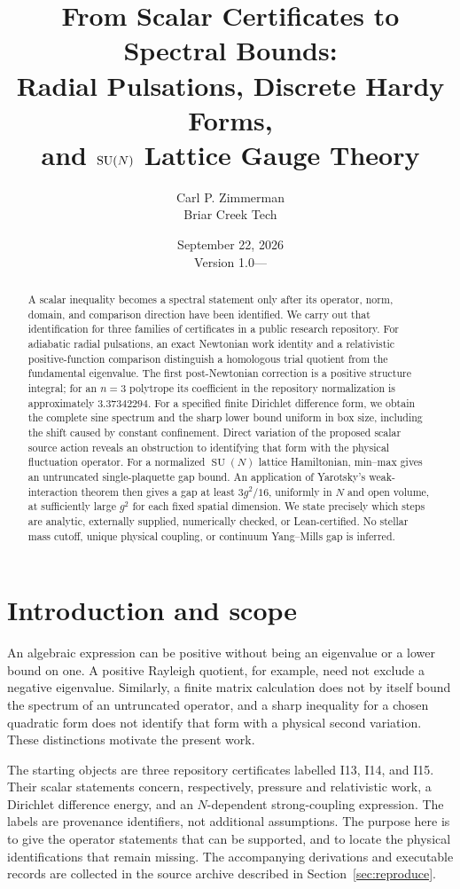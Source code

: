 \documentclass[11pt,letterpaper]{article}
\title{From Scalar Certificates to Spectral Bounds:\\
Radial Pulsations, Discrete Hardy Forms,\\
and $\SU(N)$ Lattice Gauge Theory}
\author{Carl P. Zimmerman\\[2pt]\small Briar Creek Tech}
\date{September 22, 2026\\\small Version 1.0\quad---\quad\paperdoi}
\newcommand{\SU}{\operatorname{SU}}
\theoremstyle{definition}
\numberwithin{equation}{section}
\begin{document}
\maketitle

\begin{abstract}
A scalar inequality becomes a spectral statement only after its operator,
norm, domain, and comparison direction have been identified. We carry out
that identification for three families of certificates in a public research
repository. For adiabatic radial pulsations, an exact Newtonian work identity
and a relativistic positive-function comparison distinguish a homologous
trial quotient from the fundamental eigenvalue. The first post-Newtonian
correction is a positive structure integral; for an $n=3$ polytrope its
coefficient in the repository normalization is approximately $3.37342294$.
For a specified finite Dirichlet difference form, we obtain the complete
sine spectrum and the sharp lower bound uniform in box size, including the
shift caused by constant confinement. Direct variation of the proposed
scalar source action reveals an obstruction to identifying that form with
the physical fluctuation operator. For a normalized $\SU(N)$ lattice
Hamiltonian, min--max gives an untruncated single-plaquette gap bound.
An application of Yarotsky's weak-interaction theorem then gives a gap
at least $3g^2/16$, uniformly in $N$ and open volume, at sufficiently large
$g^2$ for each fixed spatial dimension. We state precisely which steps are
analytic, externally supplied, numerically checked, or Lean-certified.
No stellar mass cutoff, unique physical coupling, or continuum Yang--Mills
gap is inferred.
\end{abstract}

\section{Introduction and scope}

An algebraic expression can be positive without being an eigenvalue or a
lower bound on one. A positive Rayleigh quotient, for example, need not
exclude a negative eigenvalue. Similarly, a finite matrix calculation does
not by itself bound the spectrum of an untruncated operator, and a sharp
inequality for a chosen quadratic form does not identify that form with a
physical second variation. These distinctions motivate the present work.

The starting objects are three repository certificates labelled I13, I14,
and I15. Their scalar statements concern, respectively, pressure and
relativistic work, a Dirichlet difference energy, and an $N$-dependent
strong-coupling expression. The labels are provenance identifiers, not
additional assumptions. The purpose here is to give the operator statements
that can be supported, and to locate the physical identifications that
remain missing. The accompanying derivations and executable records are
collected in the source archive described in Section~\ref{sec:reproduce}.
\end{document}
